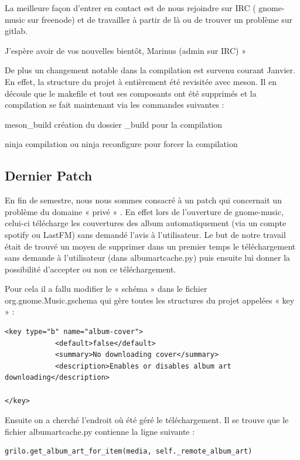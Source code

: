 \documentclass[12pt]{report}
\begin{document}
La meilleure façon d'entrer en contact est de nous rejoindre sur IRC ( gnome-music sur freenode) et de travailler à partir de là ou de trouver un problème sur gitlab.

J'espère avoir de vos nouvelles bientôt,
Marinus (admin sur IRC) »



De plus un changement notable dans la compilation est survenu courant Janvier. En effet, la structure du projet à entièrement été revisitée avec meson. Il en découle que le makefile et tout ses composants ont été supprimés et la compilation se fait maintenant via les commandes suivantes :

meson_build 		création du dossier _build pour la compilation

ninja 			compilation 
ou 
ninja reconfigure 	pour forcer la compilation 

\subsection{Dernier Patch}
En fin de semestre, nous nous sommes consacré à un patch qui concernait un problème du domaine « privé » . En effet lors de l'ouverture de gnome-music, celui-ci télécharge les couvertures des album automatiquement (via un compte spotify ou LastFM) sans demandé l'avis à l'utilisateur. Le but de notre travail était de trouvé un moyen de supprimer dans un premier temps le téléchargement sans demande à l'utilisateur (dans albumartcache.py)  puis ensuite lui donner la possibilité d'accepter ou non ce téléchargement. 

Pour cela il a fallu modifier le « schéma » dans le fichier org.gnome.Music.gschema qui gère toutes les structures du projet appelées « key » :

\begin{verbatim}
<key type="b" name="album-cover">
        	<default>false</default>
        	<summary>No downloading cover</summary>
        	<description>Enables or disables album art downloading</description>

</key>
\end{verbatim}

Ensuite on a cherché l'endroit où été géré le téléchargement. Il se trouve que le fichier albumartcache.py contienne la ligne suivante :

\begin{verbatim}
grilo.get_album_art_for_item(media, self._remote_album_art)
\end{verbatim}
\end{document}
